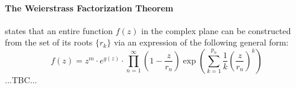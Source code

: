 \paragraph{The Weierstrass Factorization Theorem}
states that an entire function $f(z)$ in the complex plane can be constructed from the set of its roots $\{ r_k \}$ via an expression of the following general form:
\begin{equation}
f(z) = z^m \cdot e^{g(z)} \cdot \prod_{n=1}^{\infty} 
       \left(1 - \frac{z}{r_n} \right)
       \exp \left( \sum_{k=1}^{p_n} \frac{1}{k} \left( \frac{z}{r_n} \right)^k \right)
\end{equation}
...TBC...






